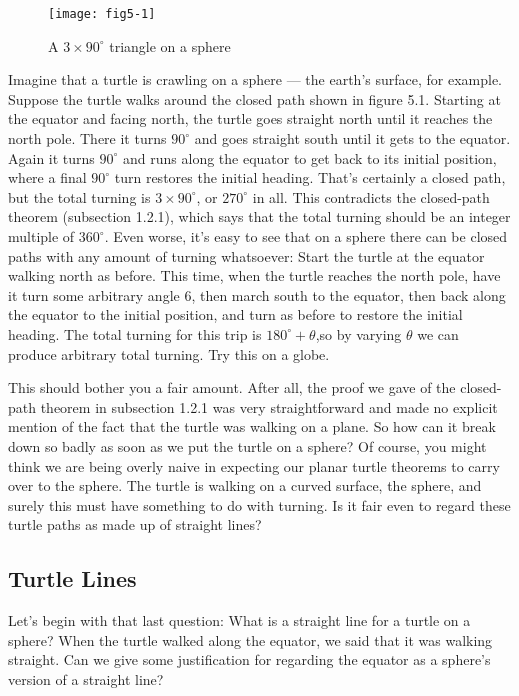 \documentclass{book}
\begin{document}
\begin{figure}
\begin{center}
\texttt{[image: fig5-1]}
\caption{A $3 \times 90^{\circ}$ triangle on a sphere}
\end{center}
\end{figure}


Imagine that a turtle is crawling on a sphere --- the earth's surface, for
example. Suppose the turtle walks around the closed path shown in
figure 5.1. Starting at the equator and facing north, the turtle goes
straight north until it reaches the north pole. There it turns $90^{\circ}$ and
goes straight south until it gets to the equator. Again it turns $90^{\circ}$ and
runs along the equator to get back to its initial position, where a final $90^{\circ}$
turn restores the initial heading. That's certainly a closed path, but the
total turning is $3 \times 90^{\circ}$, or $270^{\circ}$ in all. This contradicts the closed-path
theorem (subsection 1.2.1), which says that the total turning should be
an integer multiple of $360^{\circ}$. Even worse, it's easy to see that on a sphere
there can be closed paths with any amount of turning whatsoever: Start
the turtle at the equator walking north as before. This time, when the
turtle reaches the north pole, have it turn some arbitrary angle 6, then
march south to the equator, then back along the equator to the initial
position, and turn as before to restore the initial heading. The total
turning for this trip is $180^{\circ}+\theta$,so by varying $\theta$ we can produce arbitrary
total turning. Try this on a globe.

This should bother you a fair amount. After all, the proof we gave
of the closed-path theorem in subsection 1.2.1 was very straightforward
and made no explicit mention of the fact that the turtle was walking on
a plane. So how can it break down so badly as soon as we put the turtle
on a sphere? Of course, you might think we are being overly naive in
expecting our planar turtle theorems to carry over to the sphere. The
turtle is walking on a curved surface, the sphere, and surely this must
have something to do with turning. Is it fair even to regard these turtle
paths as made up of straight lines?

\subsection{Turtle Lines}

Let's begin with that last question: What is a straight line for a turtle
on a sphere? When the turtle walked along the equator, we said that it
was walking straight. Can we give some justification for regarding the
equator as a sphere's version of a straight line?
\end{document}
